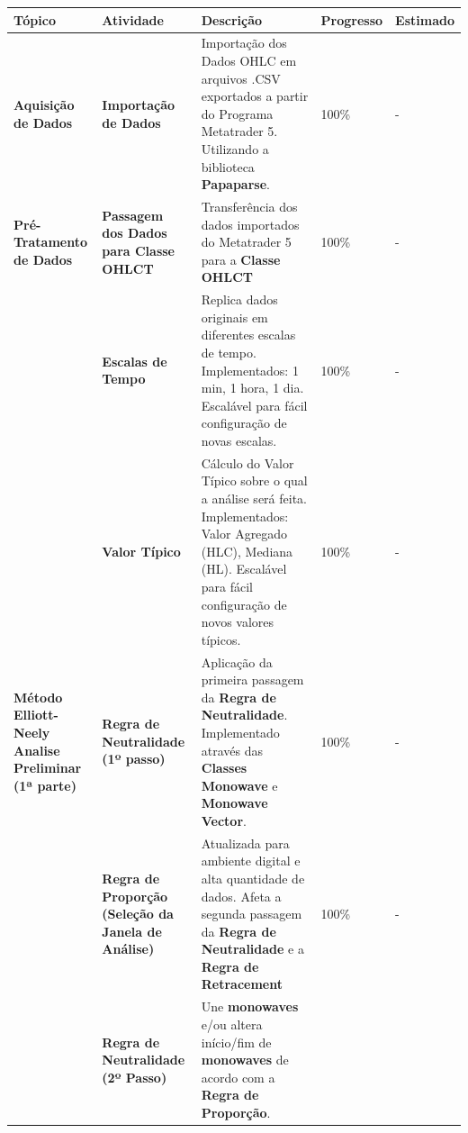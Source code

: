 \documentclass[12pt]{article}
\begin{document}
\begingroup
\renewcommand*{\arraystretch}{1.5}
\begin{table}[H]
\scriptsize
\begin{tabular}{|L{3cm}|L{2cm}|L{5cm}|R{1.4cm}|R{1.4cm}|}
	\hline
	\textbf{Tópico} & \textbf{Atividade} & \textbf{Descrição} & \textbf{Progresso} & \textbf{Estimado} \\
	\hline
	\hline
	\textbf{Aquisição de Dados}
		& \textbf{Importação de Dados}
		& 	Importação dos Dados OHLC em arquivos .CSV exportados a partir do Programa Metatrader 5. \newline
			Utilizando a biblioteca \textbf{Papaparse}.
		& 100\%
		& - \\
	\hline
	\textbf{Pré-Tratamento de Dados}
		& \textbf{Passagem dos Dados para Classe OHLCT}
		& Transferência dos dados importados do Metatrader 5 para a \textbf{Classe OHLCT}
		& 100\%
		& - \\
		& \textbf{Escalas de Tempo}
		&	Replica dados originais em diferentes escalas de tempo. \newline
			Implementados: 1 min, 1 hora, 1 dia. \newline
			Escalável para fácil configuração de novas escalas.
		& 100\%
		& - \\
		& \textbf{Valor Típico}
		&	Cálculo do Valor Típico sobre o qual a análise será feita. \newline
			Implementados: Valor Agregado (HLC), Mediana (HL). \newline
			Escalável para fácil configuração de novos valores típicos.
		& 100\%
		& - \\
	\hline
	\textbf{Método Elliott-Neely \newline Analise Preliminar \newline (1ª parte)}
		& \textbf{Regra de Neutralidade (1º passo)}
		&	Aplicação da primeira passagem da \textbf{Regra de Neutralidade}. \newline
			Implementado através das \textbf{Classes Monowave} e \textbf{Monowave Vector}.
		& 100\%
		& - \\
		& \textbf{Regra de Proporção \newline (Seleção da Janela de Análise)}
		&	Atualizada para ambiente digital e alta quantidade de dados. \newline
			Afeta a segunda passagem da \textbf{Regra de Neutralidade} e a \textbf{Regra de Retracement}
		& 100\%
		& - \\
		& \textbf{Regra de Neutralidade (2º Passo)}
		& Une \textbf{monowaves} e/ou altera início/fim de \textbf{monowaves} de acordo com a \textbf{Regra de Proporção}.

\end{tabular}
\end{table}
\end{document}
